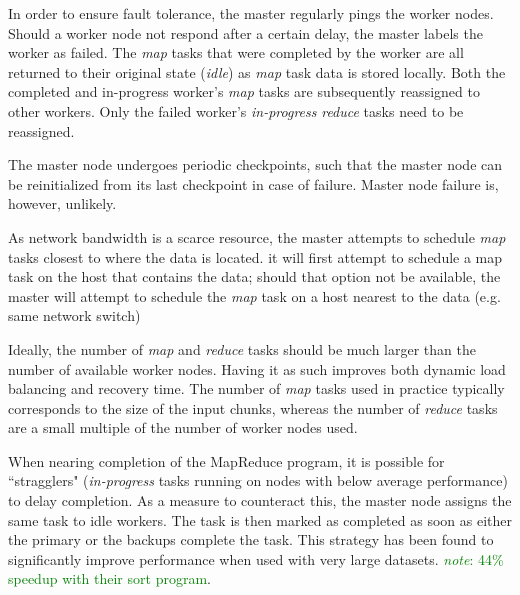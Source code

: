 \documentclass{report}
\newcommand{\note}[1]{\textcolor{green}{\textit{note}: #1}}
\begin{document}
        In order to ensure fault tolerance, the master regularly pings 
        the worker nodes. Should a worker node not respond after a certain
        delay, the master labels the worker as failed. The \textit{map} 
        tasks that were completed by the worker are all returned to their
        original state (\textit{idle}) as \textit{map} task data is stored
        locally. Both the completed and in-progress worker's \textit{map}
        tasks are subsequently reassigned to other workers. Only the failed
        worker's \textit{in-progress} \textit{reduce} tasks need to be 
        reassigned.

        The master node undergoes periodic checkpoints, such that the 
        master node can be reinitialized from its last checkpoint in 
        case of failure. Master node failure is, however, unlikely.

        As network bandwidth is a scarce resource, the master attempts 
        to schedule \textit{map} tasks closest to where the data is 
        located. it will first attempt to schedule a map task on the host
        that contains the data; should that option not be available, the
        master will attempt to schedule the \textit{map} task on a host 
        nearest to the data (e.g. same network switch)

        Ideally, the number of \textit{map} and \textit{reduce} tasks 
        should be much larger than the number of available worker nodes. 
        Having it as such improves both dynamic load balancing and recovery 
        time. The number of \textit{map} tasks used in practice typically 
        corresponds to the size of the input chunks, whereas the number of 
        \textit{reduce} tasks are a small multiple of the number of worker 
        nodes used.

        When nearing completion of the MapReduce program, it is possible for
        ``stragglers" (\textit{in-progress} tasks running on nodes with below
        average performance) to delay completion. As a measure to counteract 
        this, the master node assigns the same task to idle workers. The task 
        is then marked as completed as soon as either the primary or the 
        backups complete the task. This strategy has been found to 
        significantly improve performance when used with very large datasets. 
        \note{44\% speedup with their sort program}.
\end{document}

